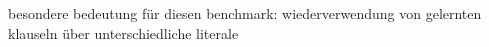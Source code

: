 
besondere bedeutung für diesen benchmark: wiederverwendung von gelernten klauseln über unterschiedliche literale